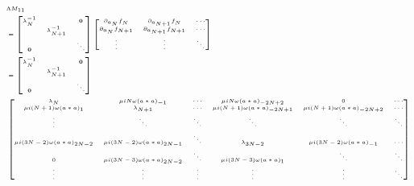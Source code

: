 \documentclass[11pt,a4paper]{jsarticle}
\theoremstyle{definition}
\begin{document}
\begin{equation}
  \tiny
  \begin{split}
    &\Lambda M_{11}\\
    &=\begin{bmatrix}
      \lambda^{-1}_N & & \mathbf{0} \\
      & \lambda^{-1}_{N+1} &\\
      \mathbf{0} &  & \ddots
    \end{bmatrix}
    \begin{bmatrix}
      \partial_{a_{N}} f_{N} & \partial_{a_{N+1}} f_{N}  & \cdots \\
      \partial_{a_{N}} f_{N+1} & \partial_{a_{N+1}} f_{N+1}  & \cdots \\
      \vdots & \vdots & \ddots \\
    \end{bmatrix}\\
    &=\begin{bmatrix}
      \lambda^{-1}_N &  & \mathbf{0} \\
      & \lambda^{-1}_{N+1} &\\
      \mathbf{0} &  & \ddots
    \end{bmatrix}\\
    &\begin{bmatrix}
      \lambda_{N} & \mu i N \omega (a*a)_{-1} & \cdots & \mu i N \omega (a*a)_{-2N+2} & 0 & \cdots \\
      \mu i (N+1) \omega (a*a)_{1} & \lambda_{N+1} & \cdots & \mu i (N+1) \omega (a*a)_{-2N+1} & \mu i (N+1) \omega (a*a)_{-2N+2} & \cdots \\
      \vdots & \ddots & \ddots & \ddots & \ddots & \ddots \\
      \mu i (3N-2) \omega (a*a)_{2N-2} & \mu i (3N-2) \omega (a*a)_{2N-1} & \ddots & \lambda_{3N-2} & \mu i (3N-2) \omega (a*a)_{-1} & \cdots \\
      0 & \mu i (3N-3) \omega (a*a)_{2N-2} & \ddots & \mu i (3N-3) \omega (a*a)_{1} & \ddots & \ddots \\
      \vdots & \vdots & \vdots & \vdots & \vdots & \ddots \\
    \end{bmatrix}
  \end{split}
\end{equation}
\end{document}
